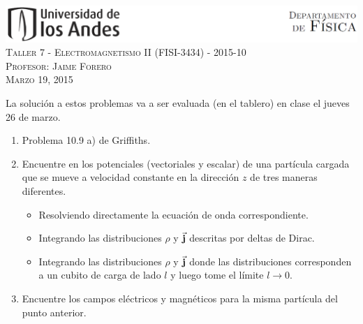 \documentclass[letterpaper,10pt,onecolumn]{article}
\begin{document}
\begin{center}

\includegraphics[width=490pt]{header.png}\\[0.5cm]

\textsc{\LARGE Taller 7 - Electromagnetismo II (FISI-3434) - 2015-10}\\[0.5cm]

\textsc{\Large{Profesor: Jaime Forero}} \\[0.5cm]

\textsc{Marzo 19, 2015} \\[0.5cm]

\end{center}

La soluci\'on a estos problemas va a ser evaluada (en el tablero) en
clase el jueves 26 de marzo. 

\begin{enumerate}
\item Problema 10.9 a) de Griffiths.
\item Encuentre en los potenciales (vectoriales y escalar) de una
  part\'icula cargada que se mueve a velocidad constante en la
  direcci\'on $z$ de tres maneras diferentes.
\begin{itemize}
\item Resolviendo directamente la ecuaci\'on de onda correspondiente.
\item Integrando las distribuciones $\rho$ y $\vec{{\bf j}}$ descritas
  por deltas de Dirac. 
\item Integrando las distribuciones $\rho$ y $\vec{{\bf j}}$ donde las
  distribuciones corresponden a un cubito de carga de lado $l$ y luego
  tome el l\'imite $l\rightarrow 0$. 
\end{itemize}
\item Encuentre los campos el\'ectricos y magn\'eticos para la misma
  part\'icula del punto anterior.
\end{enumerate}
\end{document}
